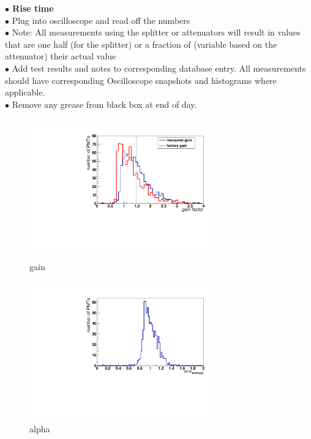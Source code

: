 \textbf{\color[rgb]{1,0.5,0}$\bullet$ Rise time}\\
$\bullet$ Plug into oscilloscope and read off the numbers\\
$\bullet$ Note: All measurements using the splitter or attenuators will result in values that are one half (for the splitter) or a fraction of (variable based on the attenuator) their actual value\\
$\bullet$ Add test results and notes to corresponding database entry. All measurements should have corresponding Oscilloscope snapshots and histograms where applicable.\\
$\bullet$ Remove any grease from black box at end of day.\\
\begin{figure}[ht!]
\centerline{\includegraphics[width=8cm,height=6cm]{ye/fig_ye_pmt_test/gain.pdf}}
\caption{gain}
\label{f:gain}
\end{figure}


\begin{figure}[ht!]
\centerline{\includegraphics[width=8cm,height=6cm]{ye/fig_ye_pmt_test/alpha.pdf}}
\caption{alpha}
\label{f:alpha}
\end{figure}

